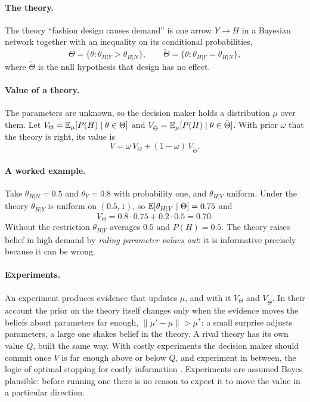 \paragraph{The theory.} The theory ``fashion design causes demand'' is one arrow $Y \to H$ in a Bayesian network together
with an inequality on its conditional probabilities,
\begin{equation}
  \Theta = \{\theta : \theta_{H|Y} > \theta_{H|N}\},
  \qquad
  \tilde\Theta = \{\theta : \theta_{H|Y} = \theta_{H|N}\},
\end{equation}
where $\tilde\Theta$ is the null hypothesis that design has no effect.

\paragraph{Value of a theory.} The parameters are unknown, so the decision maker holds a distribution $\mu$ over them. Let
$V_\Theta = \mathbb{E}_{\mu}[P(H)\mid\theta\in\Theta]$ and $V_{\tilde\Theta} = \mathbb{E}_{\mu}[P(H)\mid\theta\in\tilde\Theta]$. With prior
$\omega$ that the theory is right, its value is
\begin{equation}
  V = \omega\,V_\Theta + (1-\omega)\,V_{\tilde\Theta}.
  \label{eq:value}
\end{equation}

\paragraph{A worked example.} Take $\theta_{H|N}=0.5$ and $\theta_Y=0.8$ with probability one, and $\theta_{H|Y}$ uniform.
Under the theory $\theta_{H|Y}$ is uniform on $(0.5,1)$, so $\mathbb{E}[\theta_{H|Y}\mid\Theta]=0.75$ and
\begin{equation}
  V_\Theta = 0.8\cdot 0.75 + 0.2\cdot 0.5 = 0.70 .
\end{equation}
Without the restriction $\theta_{H|Y}$ averages $0.5$ and $P(H)=0.5$. The theory raises belief in high demand by
\emph{ruling parameter values out}: it is informative precisely because it can be wrong.

\paragraph{Experiments.} An experiment produces evidence that updates $\mu$, and with it $V_\Theta$ and
$V_{\tilde\Theta}$. In their account the prior on the theory itself changes only when the evidence moves the beliefs about
parameters far enough, $\lVert \mu' - \mu \rVert > \mu^*$: a small surprise adjusts parameters, a large one shakes belief in
the theory. A rival theory has its own value $Q$, built the same way. With costly experiments the decision maker should
commit once $V$ is far enough above or below $Q$, and experiment in between, the logic of optimal stopping for
costly information \citep{moscarini2001optimal}. Experiments are assumed Bayes plausible: before running one there is no
reason to expect it to move the value in a particular direction.

